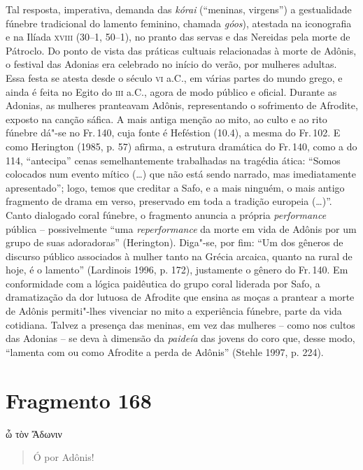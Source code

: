{\pagebreak
Tal resposta, imperativa, demanda das \textit{kórai} (``meninas, virgens'') a gestualidade fúnebre tradicional do lamento feminino, chamada \textit{góos}), atestada na iconografia e na Ilíada \textsc{xviii} (30--1, 50--1), no pranto das servas e das Nereidas pela morte de Pátroclo.
Do ponto de vista das práticas cultuais relacionadas à morte de Adônis, o festival das Adonias 
era celebrado no início do verão, por mulheres adultas. Essa festa se atesta 
desde o século \textsc{vi} a.C., em várias partes do
mundo grego, e ainda é feita no Egito do \textsc{iii} a.C., agora de modo público e
oficial. Durante as Adonias, as mulheres pranteavam Adônis, representando o
sofrimento de Afrodite, exposto na canção sáfica. A mais antiga
menção ao mito, ao culto e ao rito fúnebre dá"-se no Fr.\,140, cuja fonte é
Heféstion (10.4), a mesma do Fr.\,102. E como Herington (1985, p. 57) afirma, a estrutura dramática do Fr.\,140,  como a do 114, “antecipa” cenas semelhantemente trabalhadas na tragédia ática: “Somos colocados num evento mítico (\ldots{}) que não está sendo narrado, mas imediatamente apresentado”; logo,  temos que creditar a Safo, e a mais ninguém, o mais antigo fragmento de drama em verso, preservado em toda a tradição europeia (\ldots{})”. Canto dialogado coral fúnebre, o fragmento anuncia a própria \textit{performance} pública -- possivelmente “uma \textit{reperformance} da morte em vida de Adônis por um grupo de suas adoradoras” (Herington). Diga"-se, por fim: “Um dos gêneros de discurso público associados à mulher tanto na Grécia arcaica, quanto na rural de hoje, é o lamento” (Lardinois 1996, p. 172), justamente o gênero do Fr.\,140. Em conformidade com a lógica
paidêutica do grupo coral liderada por Safo, a dramatização da dor lutuosa de Afrodite que ensina as moças a prantear a morte de Adônis permiti"-lhes vivenciar no mito a experiência fúnebre, parte da vida cotidiana. Talvez a presença das meninas, em vez das mulheres -- como nos cultos das Adonias -- se deva à dimensão da \textit{paideía} das jovens do coro que, desse modo, “lamenta com ou como Afrodite a perda de Adônis” (Stehle 1997, p. 224). }

\pagebreak
\section{Fragmento 168}

\begin{gkverse}
ὦ τὸν Ἄδωνιν
\end{gkverse}

\begin{verse}
Ó por Adônis!
\end{verse}

